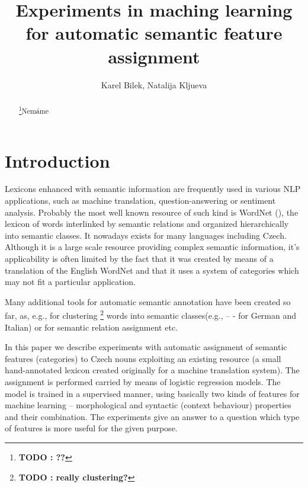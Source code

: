 \documentclass[letterpaper]{article}
\newcommand{\todofn}[1] {
 \footnote{\textbf{TODO : #1}}}
\begin{document}
%

\title{Experiments in maching learning for automatic semantic feature assignment}
\author{Karel Bilek, Natalija Kljueva}
\maketitle
\begin{abstract}
\todofn{??}Nemáme
\end{abstract}


\section{Introduction}

Lexicons enhanced with semantic information are frequently used 
in various NLP applications, such as machine translation, question-answering
or sentiment analysis. Probably the most well known resource of such kind is 
WordNet (\cite{wordnet}), the lexicon of words
interlinked by semantic relations and organized hierarchically into 
semantic classes. It nowadays exists for many languages including Czech. Although it is a large scale resource providing complex semantic information, it's applicability is often limited by the fact that it was created by means of a translation of the English WordNet and that it uses a system of categories which may not fit a particular application.

Many additional tools for automatic semantic annotation have been created so far, as, e.g., 
for clustering\todofn{really clustering?} words into semantic classes(e.g., \cite{baroni:2009} -- - for German and Italian) or for 
semantic relation assignment \cite{peirsman} etc.  
 

In this paper we describe experiments with automatic assignment of semantic features (categories) to Czech nouns
exploiting an existing resource (a small hand-annotated lexicon created originally for a machine translation system). The assignment is performed carried by means of logistic regression models. The model is trained in a supervised manner, using 
basically two kinds of features for machine learning --  morphological and syntactic (context behaviour) properties and their combination. The experiments give an answer to a question which type of features is more useful for the given purpose.   
\end{document}
